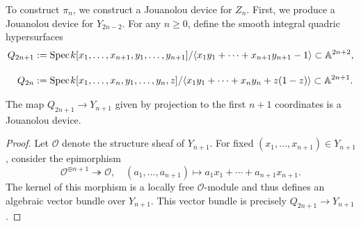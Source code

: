 To construct $\pi_n$, we construct a Jouanolou device for $Z_n$. First, we produce a Jouanolou device for $Y_{2n-2}$. For any $n \geq 0$, define the smooth integral quadric hypersurfaces
    \begin{align*}
        Q_{2n+1} &:= \text{Spec}\hspace{0.1em} k[x_1,\ldots,x_{n+1},y_1,\ldots,y_{n+1}]/\langle x_1y_1 + \cdots + x_{n+1}y_{n+1}- 1\rangle \subset \mathbb{A}^{2n+2}, \\[10pt]
        Q_{2n} &:= \text{Spec}\hspace{0.1em} k[x_1,\ldots,x_n,y_1,\ldots,y_n,z]/\langle x_1y_1 + \cdots + x_ny_n + z(1-z)\rangle \subset \mathbb{A}^{2n+1}. 
\end{align*}

\begin{proposition}\cite[Lemma 2.8]{Lerbet} 
    The map $Q_{2n+1} \to Y_{n+1}$ given by projection to the first $n+1$ coordinates is a Jouanolou device.
\end{proposition}

\begin{proof}
    Let $\mathcal{O}$ denote the structure sheaf of $Y_{n+1}$. For fixed $(x_1,\ldots,x_{n+1}) \in Y_{n+1}$, consider the epimorphism
    \[
    \mathcal{O}^{\oplus n+1} \twoheadrightarrow \mathcal{O}, \quad (a_1,\ldots,a_{n+1}) \mapsto 
    a_1x_1 + \cdots + a_{n+1}x_{n+1}.\] The kernel of this morphism is a locally free $\mathcal{O}$-module and thus defines an algebraic vector bundle over $Y_{n+1}$. This vector bundle is precisely $Q_{2n+1} \to Y_{n+1}$.
\end{proof}

